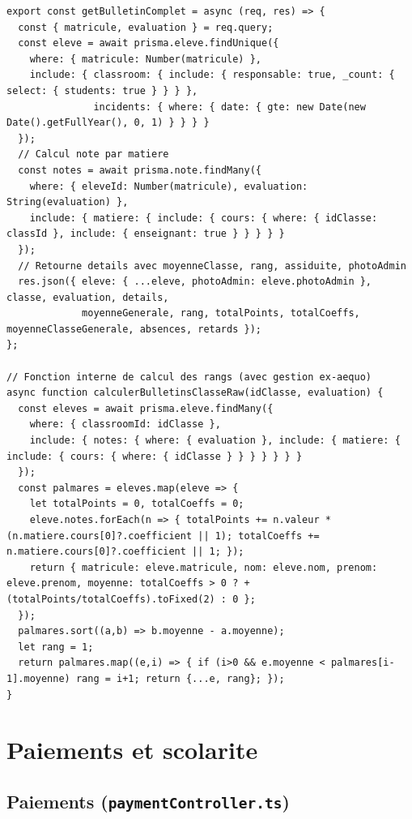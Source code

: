 \documentclass[12pt,a4paper]{article}
\begin{document}
\begin{lstlisting}[style=code]
export const getBulletinComplet = async (req, res) => {
  const { matricule, evaluation } = req.query;
  const eleve = await prisma.eleve.findUnique({
    where: { matricule: Number(matricule) },
    include: { classroom: { include: { responsable: true, _count: { select: { students: true } } } },
               incidents: { where: { date: { gte: new Date(new Date().getFullYear(), 0, 1) } } } }
  });
  // Calcul note par matiere
  const notes = await prisma.note.findMany({
    where: { eleveId: Number(matricule), evaluation: String(evaluation) },
    include: { matiere: { include: { cours: { where: { idClasse: classId }, include: { enseignant: true } } } } }
  });
  // Retourne details avec moyenneClasse, rang, assiduite, photoAdmin
  res.json({ eleve: { ...eleve, photoAdmin: eleve.photoAdmin }, classe, evaluation, details,
             moyenneGenerale, rang, totalPoints, totalCoeffs, moyenneClasseGenerale, absences, retards });
};

// Fonction interne de calcul des rangs (avec gestion ex-aequo)
async function calculerBulletinsClasseRaw(idClasse, evaluation) {
  const eleves = await prisma.eleve.findMany({
    where: { classroomId: idClasse },
    include: { notes: { where: { evaluation }, include: { matiere: { include: { cours: { where: { idClasse } } } } } } }
  });
  const palmares = eleves.map(eleve => {
    let totalPoints = 0, totalCoeffs = 0;
    eleve.notes.forEach(n => { totalPoints += n.valeur * (n.matiere.cours[0]?.coefficient || 1); totalCoeffs += n.matiere.cours[0]?.coefficient || 1; });
    return { matricule: eleve.matricule, nom: eleve.nom, prenom: eleve.prenom, moyenne: totalCoeffs > 0 ? +(totalPoints/totalCoeffs).toFixed(2) : 0 };
  });
  palmares.sort((a,b) => b.moyenne - a.moyenne);
  let rang = 1;
  return palmares.map((e,i) => { if (i>0 && e.moyenne < palmares[i-1].moyenne) rang = i+1; return {...e, rang}; });
}
\end{lstlisting}

\newpage

\section{Paiements et scolarite}

\subsection{Paiements (\texttt{paymentController.ts})}
\end{document}
